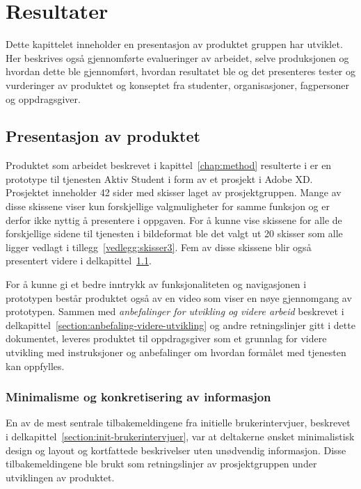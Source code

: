 \cleardoublepage
\chapter{Resultater}
\label{chap:results} 

Dette kapittelet inneholder en presentasjon av produktet gruppen har utviklet. Her beskrives også gjennomførte evalueringer av arbeidet, selve produksjonen og hvordan dette ble gjennomført, hvordan resultatet ble og det presenteres tester og vurderinger av produktet og konseptet fra studenter, organisasjoner, fagpersoner og oppdragsgiver.

\section{Presentasjon av produktet}
\label{section:presentasjon-produkt}
Produktet som arbeidet beskrevet i kapittel~\ref{chap:method} resulterte i er en prototype til tjenesten Aktiv Student i form av et prosjekt i Adobe XD. Prosjektet inneholder 42 sider med skisser laget av prosjektgruppen. Mange av disse skissene viser kun forskjellige valgmuligheter for samme funksjon og er derfor ikke nyttig å presentere i oppgaven. For å kunne vise skissene for alle de forskjellige sidene til tjenesten i bildeformat ble det valgt ut 20 skisser som alle ligger vedlagt i tillegg~\ref{vedlegg:skisser3}. Fem av disse skissene blir også presentert videre i delkapittel~\ref{section:presentasjon-produkt}.

For å kunne gi et bedre inntrykk av funksjonaliteten og navigasjonen i prototypen består produktet også av en video som viser en nøye gjennomgang av prototypen. Sammen med {\em anbefalinger for utvikling og videre arbeid} beskrevet i delkapittel~\ref{section:anbefaling-videre-utvikling} og andre retningslinjer gitt i dette dokumentet, leveres produktet til oppdragsgiver som et grunnlag for videre utvikling med instruksjoner og anbefalinger om hvordan formålet med tjenesten kan oppfylles.

\subsection{Minimalisme og konkretisering av informasjon}
En av de mest sentrale tilbakemeldingene fra initielle brukerintervjuer, beskrevet i delkapittel~\ref{section:init-brukerintervjuer}, var at deltakerne ønsket minimalistisk design og layout og kortfattede beskrivelser uten unødvendig informasjon. Disse tilbakemeldingene ble brukt som retningslinjer av prosjektgruppen under utviklingen av produktet. 

